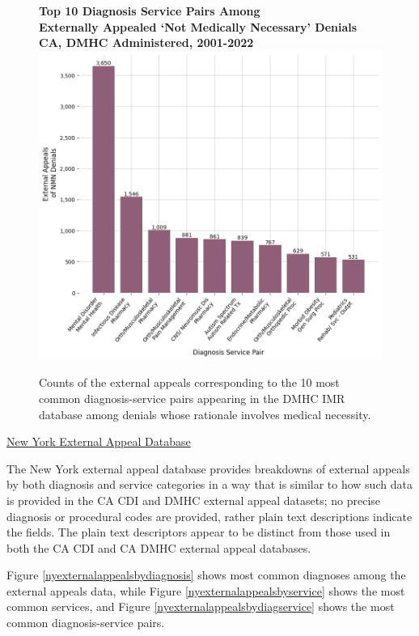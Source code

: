 \documentclass[12pt, a4paper,twoside,parskip=full]{report}
\theoremstyle{plain} %
\theoremstyle{definition} %
\theoremstyle{remark} %
\numberwithin{equation}{chapter}
\begin{document}
		
		\begin{figure}[h!]
			\centering
			\textbf{Top 10 Diagnosis Service Pairs Among}\\
			\textbf{Externally Appealed `Not Medically Necessary' Denials}\\
			\textbf{CA, DMHC Administered, 2001-2022}\\
			\includegraphics[width=.8\textwidth]{images/ca_dmhc_external_appeals/top_nmn_appeal_diag_service.png}
			\caption{Counts of the external appeals corresponding to the 10 most common diagnosis-service pairs appearing in the DMHC IMR database among denials whose rationale involves medical necessity.}
			\label{cadmhcnmnexternalappealdiagservice}
		\end{figure}
		\clearpage
	
		\underline{New York External Appeal Database}
		
		The New York external appeal database provides breakdowns of external appeals by both diagnosis and service categories in a way that is similar to how such data is provided in the CA CDI and DMHC external appeal datasets; no precise diagnosis or procedural codes are provided, rather plain text descriptions indicate the fields. The plain text descriptors appear to be distinct from those used in both the CA CDI and CA DMHC external appeal databases.
		
		Figure \ref{nyexternalappealsbydiagnosis} shows most common diagnoses among the external appeals data, while Figure \ref{nyexternalappealsbyservice} shows the most common services, and Figure \ref{nyexternalappealsbydiagservice} shows the most common diagnosis-service pairs.
		
\end{document}

